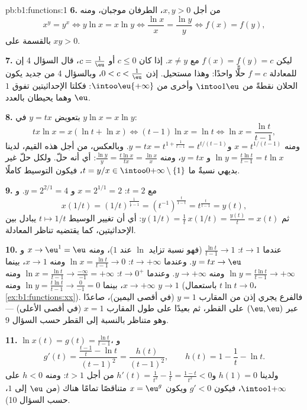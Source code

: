 \begin{solution}{pb:b1:functions:1}
\textbf{6.} من أجل $x, y > 0$، الطرفان موجبان، ومنه
\[
x^y = y^x \iff y\ln x = x\ln y \iff \frac{\ln x}x = \frac{\ln y}y
\iff f(x) = f(y) ,
\]
بالقسمة على $xy > 0$.

\textbf{7.} ليكن $f(x) = f(y) = c$ مع $x \neq y$. إذا كان $c \leq 0$ أو
$c = \frac1\eu$، قال السؤال 4 إن للمعادلة $f = c$ حلًّا
واحدًا: وهذا مستحيل. إذن $0 < c < \frac1\eu$، وبالسؤال 4 من
جديد يكون الحلان نقطةً من $\intoo1\eu$ وأخرى
من $\intoo\eu{+\infty}$: فكلتا الإحداثيتين تفوق $1$ وهما يحيطان بالعدد $\eu$.

\textbf{8.} بتعويض $y = tx$ في $y\ln x = x\ln y$:
\[
tx\ln x = x(\ln t + \ln x)
\iff (t - 1)\ln x = \ln t
\iff \ln x = \frac{\ln t}{t - 1} ,
\]
ومنه $x = t^{1/(t-1)}$ و$y = tx = t^{1 + \frac1{t-1}} =
t^{t/(t-1)}$. وبالعكس، من أجل هذه القيم، لدينا $\ln y = \frac{t\ln
t}{t-1} = t\ln x$ و $y = tx$، ومنه $\frac{\ln y}y = \frac{t\ln
x}{tx} = \frac{\ln x}x$: أي أنه حلّ. ولكل حلّ غير بديهي
نسبةٌ ما $t = y/x \in \intoo0{+\infty} \setminus \{1\}$، فيكون
التوسيط كاملًا.

\textbf{9.} مع $t = 2$: $x = 2^{1/1} = 2$ و $y = 2^{2/1} = 4$. و
\[
x(1/t) = (1/t)^{\frac1{\frac1t - 1}}
= (t^{-1})^{\frac{t}{1 - t}}
= t^{\frac{t}{t - 1}} = y(t) ,
\]
ثم $y(1/t) = \frac1t\,x(1/t) = \frac{y(t)}t = x(t)$: أي أن
تغيير الوسيط $t \mapsto 1/t$ يبادل بين الإحداثيتين، كما
يقتضيه تناظر المعادلة.

\textbf{10.} عندما $t \to 1$: $\frac{\ln t}{t-1} \to 1$ (فهو
نسبة تزايد $\ln$ عند $1$)، ومنه $x \to \eu^1 = \eu$ و
$y = tx \to \eu$. وعندما $t \to +\infty$: $\ln x = \frac{\ln t}{t-1}
\to 0$ ومنه $x \to 1$، بينما $\ln y = \frac{t\ln t}{t-1} \to
+\infty$ ومنه $y \to +\infty$. وعندما $t \to 0^+$: $\ln x = \frac{\ln
t}{t-1} \to \frac{-\infty}{-1} = +\infty$ ومنه $x \to +\infty$،
بينما $\ln y = \frac{t\ln t}{t-1} \to \frac{0}{-1} = 0$ ومنه $y \to
1$ (باستعمال $t\ln t \to 0$، \cref{ex:b1:functions:xx}). فالفرع
يجري إذن من المقارب $y = 1$ (في أقصى اليمين)، صاعدًا عبر
$(\eu, \eu)$ على القطر، ثم بعيدًا على طول المقارب $x = 1$
(في أقصى الأعلى) --- وهو متناظر بالنسبة إلى القطر حسب السؤال 9.

\textbf{11.} $\ln x(t) = g(t) = \frac{\ln t}{t-1}$، و
\[
g'(t) = \frac{\frac{t-1}t - \ln t}{(t-1)^2}
= \frac{h(t)}{(t-1)^2},
\qquad h(t) = 1 - \frac1t - \ln t .
\]
ولدينا $h(1) = 0$ و$h'(t) = \frac1{t^2} - \frac1t = \frac{1 -
t}{t^2} < 0$ من أجل $t > 1$: ومنه $h < 0$ على $\intoo1{+\infty}$، فيكون $g' <
0$ ويكون $x = \eu^g$ متناقصًا تمامًا هناك (من $\eu$ إلى
$1$، حسب السؤال 10).


\end{solution}
